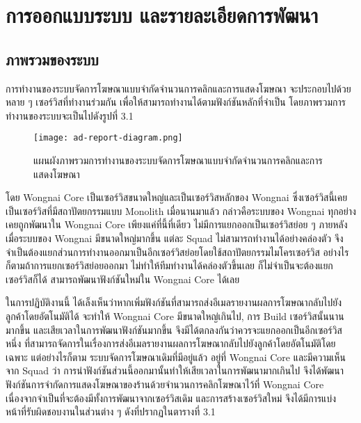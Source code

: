 \chapter{การออกแบบระบบ และรายละเอียดการพัฒนา}
\label{chapter:system-detail}
\section{ภาพรวมของระบบ}
การทำงานของระบบจัดการโฆษณาแบบจำกัดจำนวนการคลิกและการแสดงโฆษณา จะประกอบไปด้วยหลาย ๆ เซอร์วิสที่ทำงานร่วมกัน เพื่อให้สามารถทำงานได้ตามฟังก์ชันหลักที่จำเป็น โดยภาพรวมการทำงานของระบบจะเป็นไปดังรูปที่ 3.1

\begin{figure}[!h]
	\centering
	\texttt{[image: ad-report-diagram.png]}  
	\caption{แผนผังภาพรวมการทำงานของระบบจัดการโฆษณาแบบจำกัดจำนวนการคลิกและการแสดงโฆษณา}
	\label{Fig:adreport-diagram}
\end{figure}
	
โดย Wongnai Core เป็นเซอร์วิสขนาดใหญ่และเป็นเซอร์วิสหลักของ Wongnai ซึ่งเซอร์วิสนี้เคยเป็นเซอร์วิสที่มีสถาปัตยกรรมแบบ Monolith เมื่อนานมาแล้ว กล่าวคือระบบของ Wongnai ทุกอย่างเคยถูกพัฒนาใน Wongnai Core เพียงแค่ที่นี้ที่เดียว ไม่มีการแยกออกเป็นเซอร์วิสย่อย ๆ ภายหลังเมื่อระบบของ Wongnai มีขนาดใหญ่มากขึ้น แต่ละ Squad ไม่สามารถทำงานได้อย่างคล่องตัว จึงจำเป็นต้องแยกส่วนการทำงานออกมาเป็นอีกเซอร์วิสย่อยโดยใช้สถาปัตยกรรมไมโครเซอร์วิส อย่างไรก็ตามถ้าการแยกเซอร์วิสย่อยออกมา ไม่ทำให้ทีมทำงานได้คล่องตัวขึ้นเลย ก็ไม่จำเป็นจะต้องแยกเซอร์วิสก็ได้ สามารถพัฒนาฟังก์ชันใหม่ใน Wongnai Core ได้เลย ~\cite{wnservice}

ในการปฏิบัติงานนี้ ได้เล็งเห็นว่าหากเพิ่มฟังก์ชันที่สามารถส่งอีเมลรายงานผลการโฆษณากลับไปยังลูกค้าโดยอัตโนมัติได้ จะทำให้ Wongnai Core มีขนาดใหญ่เกินไป, การ Build เซอร์วิสนั้นนานมากขึ้น และเสียเวลาในการพัฒนาฟังก์ชันมากขึ้น จึงมีได้ตกลงกันว่าควรจะแยกออกเป็นอีกเซอร์วิสหนึ่ง ที่สามารถจัดการในเรื่องการส่งอีเมลรายงานผลการโฆษณากลับไปยังลูกค้าโดยอัตโนมัติโดยเฉพาะ แต่อย่างไรก็ตาม ระบบจัดการโฆษณาเดิมที่มีอยู่แล้ว อยู่ที่ Wongnai Core และมีความเห็นจาก Squad ว่า การนำฟังก์ชันส่วนนี้ออกมานั้นทำให้เสียเวลาในการพัฒนามากเกินไป จึงได้พัฒนาฟังก์ชันการจำกัดการแสดงโฆษณาของร้านด้วยจำนวนการคลิกโฆษณาไว้ที่ Wongnai Core เนื่องจากจำเป็นที่จะต้องมีทั้งการพัฒนาจากเซอร์วิสเดิม และการสร้างเซอร์วิสใหม่ จึงได้มีการแบ่งหน้าที่รับผิดชอบงานในส่วนต่าง ๆ ดังที่ปรากฏในตารางที่ 3.1

